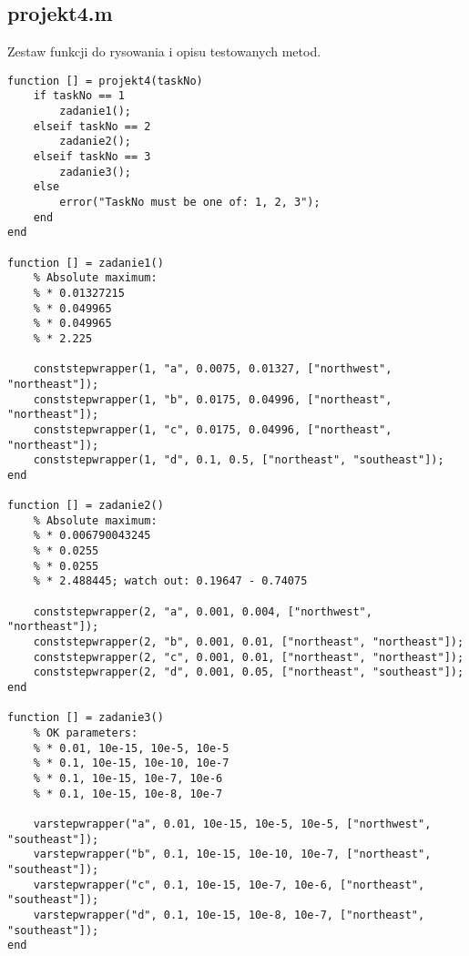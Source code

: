 \documentclass[12pt]{article}
\begin{document}
\subsection{projekt4.m}
Zestaw funkcji do rysowania i opisu testowanych metod.
\begin{verbatim}
function [] = projekt4(taskNo)
    if taskNo == 1
        zadanie1();
    elseif taskNo == 2
        zadanie2();
    elseif taskNo == 3
        zadanie3();
    else
        error("TaskNo must be one of: 1, 2, 3");
    end
end

function [] = zadanie1()
    % Absolute maximum:
    % * 0.01327215
    % * 0.049965
    % * 0.049965
    % * 2.225

    conststepwrapper(1, "a", 0.0075, 0.01327, ["northwest", "northeast"]);
    conststepwrapper(1, "b", 0.0175, 0.04996, ["northeast", "northeast"]);
    conststepwrapper(1, "c", 0.0175, 0.04996, ["northeast", "northeast"]);
    conststepwrapper(1, "d", 0.1, 0.5, ["northeast", "southeast"]);
end

function [] = zadanie2()
    % Absolute maximum:
    % * 0.006790043245
    % * 0.0255
    % * 0.0255
    % * 2.488445; watch out: 0.19647 - 0.74075

    conststepwrapper(2, "a", 0.001, 0.004, ["northwest", "northeast"]);
    conststepwrapper(2, "b", 0.001, 0.01, ["northeast", "northeast"]);
    conststepwrapper(2, "c", 0.001, 0.01, ["northeast", "northeast"]);
    conststepwrapper(2, "d", 0.001, 0.05, ["northeast", "southeast"]);
end

function [] = zadanie3()
    % OK parameters:
    % * 0.01, 10e-15, 10e-5, 10e-5
    % * 0.1, 10e-15, 10e-10, 10e-7
    % * 0.1, 10e-15, 10e-7, 10e-6
    % * 0.1, 10e-15, 10e-8, 10e-7

    varstepwrapper("a", 0.01, 10e-15, 10e-5, 10e-5, ["northwest", "southeast"]);
    varstepwrapper("b", 0.1, 10e-15, 10e-10, 10e-7, ["northeast", "southeast"]);
    varstepwrapper("c", 0.1, 10e-15, 10e-7, 10e-6, ["northeast", "southeast"]);
    varstepwrapper("d", 0.1, 10e-15, 10e-8, 10e-7, ["northeast", "southeast"]);
end


\end{verbatim}
\end{document}
